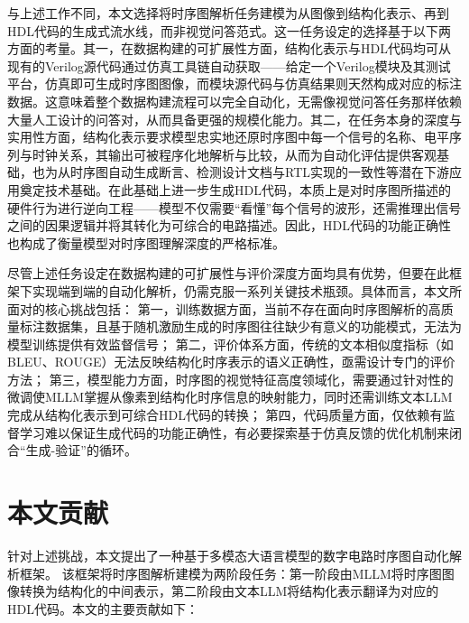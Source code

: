 与上述工作不同，本文选择将时序图解析任务建模为从图像到结构化表示、再到HDL代码的生成式流水线，而非视觉问答范式。这一任务设定的选择基于以下两方面的考量。其一，在数据构建的可扩展性方面，结构化表示与HDL代码均可从现有的Verilog源代码通过仿真工具链自动获取——给定一个Verilog模块及其测试平台，仿真即可生成时序图图像，而模块源代码与仿真结果则天然构成对应的标注数据。这意味着整个数据构建流程可以完全自动化，无需像视觉问答任务那样依赖大量人工设计的问答对，从而具备更强的规模化能力。其二，在任务本身的深度与实用性方面，结构化表示要求模型忠实地还原时序图中每一个信号的名称、电平序列与时钟关系，其输出可被程序化地解析与比较，从而为自动化评估提供客观基础，也为从时序图自动生成断言、检测设计文档与RTL实现的一致性等潜在下游应用奠定技术基础。在此基础上进一步生成HDL代码，本质上是对时序图所描述的硬件行为进行逆向工程——模型不仅需要“看懂”每个信号的波形，还需推理出信号之间的因果逻辑并将其转化为可综合的电路描述。因此，HDL代码的功能正确性也构成了衡量模型对时序图理解深度的严格标准。

尽管上述任务设定在数据构建的可扩展性与评价深度方面均具有优势，但要在此框架下实现端到端的自动化解析，仍需克服一系列关键技术瓶颈。具体而言，本文所面对的核心挑战包括：
第一，训练数据方面，当前不存在面向时序图解析的高质量标注数据集，且基于随机激励生成的时序图往往缺少有意义的功能模式，无法为模型训练提供有效监督信号；
第二，评价体系方面，传统的文本相似度指标（如BLEU、ROUGE）无法反映结构化时序表示的语义正确性，亟需设计专门的评价方法；
第三，模型能力方面，时序图的视觉特征高度领域化，需要通过针对性的微调使MLLM掌握从像素到结构化时序信息的映射能力，同时还需训练文本LLM完成从结构化表示到可综合HDL代码的转换；
第四，代码质量方面，仅依赖有监督学习难以保证生成代码的功能正确性，有必要探索基于仿真反馈的优化机制来闭合“生成-验证”的循环。


\section{本文贡献}

针对上述挑战，本文提出了一种基于多模态大语言模型的数字电路时序图自动化解析框架。
该框架将时序图解析建模为两阶段任务：第一阶段由MLLM将时序图图像转换为结构化的中间表示，第二阶段由文本LLM将结构化表示翻译为对应的HDL代码。本文的主要贡献如下：

